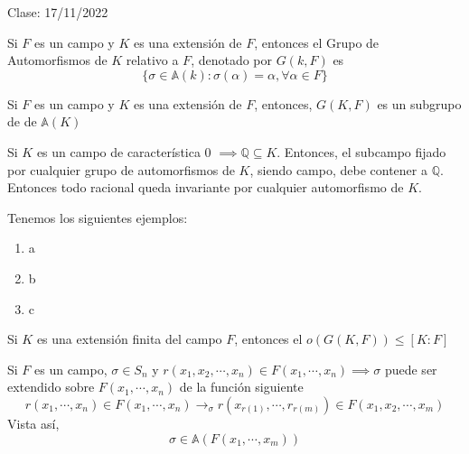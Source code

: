 Clase: 17/11/2022

\begin{definicion}
    Si $F$ es un campo y $K$ es una extensión de $F$, entonces el Grupo de Automorfismos de $K$ relativo a $F$, denotado por $G(k,F)$ es 
    $$\{\sigma\in\mathbb{A}(k):\sigma(\alpha)=\alpha,\forall \alpha\in F\}$$
\end{definicion}

\begin{lema}[5.8]
    Si $F$ es un campo y $K$ es una extensión de $F$, entonces, $G(K,F)$ es un subgrupo de de $\mathbb{A}(K)$
    \begin{dem}
        
    \end{dem}
\end{lema}

\begin{cajita}
    Si $K$ es un campo de característica 0 $\implies \mathbb{Q}\subseteq K$. Entonces, el subcampo fijado por cualquier grupo de automorfismos de $K$, siendo campo, debe contener a $\mathbb{Q}$. Entonces todo racional queda invariante por cualquier automorfismo de $K$. 
\end{cajita}

\begin{ejemplo}
    Tenemos los siguientes ejemplos:
    \begin{enumerate}
        \item a
        \item b
        \item c
    \end{enumerate}
\end{ejemplo}

\begin{teorema}[5M]
    Si $K$ es una extensión finita del campo $F$, entonces el $o(G(K,F))\leq [K:F]$
    \begin{dem}
        
    \end{dem}
\end{teorema}

\begin{cajita}
    \begin{nota}
        Si $F$ es un campo, $\sigma\in S_n$ y $r(x_1,x_2,\cdots,x_n)\in F(x_1,\cdots,x_n)\implies\sigma $ puede ser extendido sobre $F(x_1,\cdots, x_n)$ de la función siguiente
        $$r(x_1,\cdots,x_n)\in F(x_1,\cdots,x_n)\to_{\sigma} r(x_{r(1)},\cdots, r_{r(m)})\in F(x_1,x_2,\cdots, x_m)$$
        Vista así,
        $$\sigma \in \mathbb{A}(F(x_1,\cdots,x_m))$$
    \end{nota}
\end{cajita}

